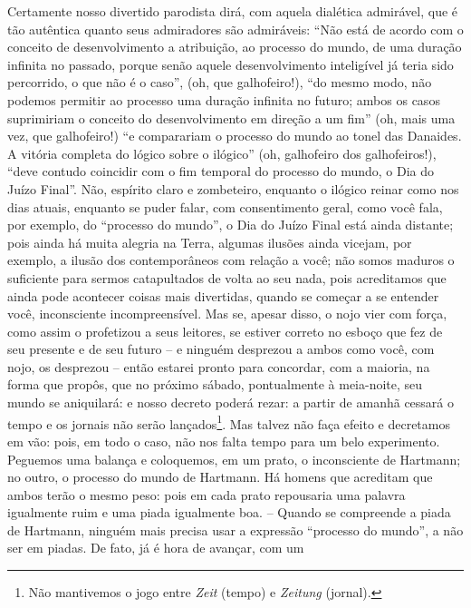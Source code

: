 \begin{enumerate}
\begin{enumerate}
    Certamente nosso divertido parodista dirá, com aquela dialética
    admirável, que é tão autêntica quanto seus admiradores são
    admiráveis: ``Não está de acordo com o conceito de desenvolvimento a
    atribuição, ao processo do mundo, de uma duração infinita no
    passado, porque senão aquele desenvolvimento inteligível já teria
    sido percorrido, o que não é o caso'', (oh, que galhofeiro!), ``do
    mesmo modo, não podemos permitir ao processo uma duração infinita no
    futuro; ambos os casos suprimiriam o conceito do desenvolvimento em
    direção a um fim'' (oh, mais uma vez, que galhofeiro!) ``e
    comparariam o processo do mundo ao tonel das Danaides. A vitória
    completa do lógico sobre o ilógico'' (oh, galhofeiro dos
    galhofeiros!), ``deve contudo coincidir com o fim temporal do
    processo do mundo, o Dia do Juízo Final''. Não, espírito claro e
    zombeteiro, enquanto o ilógico reinar como nos dias atuais, enquanto
    se puder falar, com consentimento geral, como você fala, por
    exemplo, do ``processo do mundo'', o Dia do Juízo Final está ainda
    distante; pois ainda há muita alegria na Terra, algumas ilusões
    ainda vicejam, por exemplo, a ilusão dos contemporâneos com relação
    a você; não somos maduros o suficiente para sermos catapultados de
    volta ao seu nada, pois acreditamos que ainda pode acontecer coisas
    mais divertidas, quando se começar a se entender você, inconsciente
    incompreensível. Mas se, apesar disso, o nojo vier com força, como
    assim o profetizou a seus leitores, se estiver correto no esboço que
    fez de seu presente e de seu futuro -- e ninguém desprezou a ambos
    como você, com nojo, os desprezou -- então estarei pronto para
    concordar, com a maioria, na forma que propôs, que no próximo
    sábado, pontualmente à meia-noite, seu mundo se aniquilará: e nosso
    decreto poderá rezar: a partir de amanhã cessará o tempo e os
    jornais não serão lançados\footnote{Não mantivemos o jogo entre
      \emph{Zeit} (tempo) e \emph{Zeitung} (jornal).}. Mas talvez não
    faça efeito e decretamos em vão: pois, em todo o caso, não nos falta
    tempo para um belo experimento. Peguemos uma balança e coloquemos,
    em um prato, o inconsciente de Hartmann; no outro, o processo do
    mundo de Hartmann. Há homens que acreditam que ambos terão o mesmo
    peso: pois em cada prato repousaria uma palavra igualmente ruim e
    uma piada igualmente boa. -- Quando se compreende a piada de
    Hartmann, ninguém mais precisa usar a expressão ``processo do
    mundo'', a não ser em piadas. De fato, já é hora de avançar, com um

\end{enumerate}
\end{enumerate}
